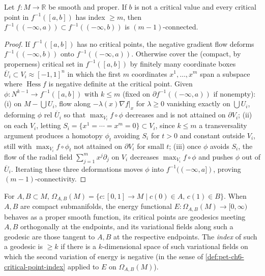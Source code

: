 \begin{theorem}[Theorem 6.5.2]
  \label{thm:pet-ch6-morse-connectivity}
  Let $f:M\to\mathbb{R}$ be smooth and proper. If $b$ is not a critical value and
  every critical point in $f^{-1}([a,b])$ has index $\ge m$, then
  $f^{-1}((-\infty,a))\subset f^{-1}((-\infty,b))$ is $(m-1)$-connected.
\end{theorem}
\begin{proof}
  If $f^{-1}([a,b])$ has no critical points, the negative gradient flow
  deforms $f^{-1}((-\infty,b))$ onto $f^{-1}((-\infty,a))$. Otherwise cover
  the (compact, by properness) critical set in $f^{-1}([a,b])$ by finitely
  many coordinate boxes $\overline U_i\subset V_i\approx[-1,1]^n$ in which the
  first $m$ coordinates $x^1,\dots,x^m$ span a subspace where $\operatorname{Hess}f$ is
  negative definite at the critical point. Given
  $\phi:N^{k-1}\to f^{-1}([a,b])$ with $k\le m$ (fixed on
  $\partial f^{-1}((-\infty,a))$ if nonempty): (i) on $M-\bigcup U_i$, flow
  along $-\lambda(x)\nabla f|_x$ for $\lambda\ge0$ vanishing exactly on
  $\bigcup U_i$, deforming $\phi$ rel $\overline U_i$ so that
  $\max_{V_i}f\circ\phi$ decreases and is not attained on $\partial V_i$;
  (ii) on each $V_i$, letting $S_i=\{x^1=\cdots=x^m=0\}\subset V_i$, since
  $k\le m$ a transversality argument produces a homotopy $\phi_t$ avoiding
  $S_i$ for $t>0$ and constant outside $V_i$, still with $\max_{V_i}
  f\circ\phi_t$ not attained on $\partial V_i$ for small $t$; (iii) once
  $\phi$ avoids $S_i$, the flow of the radial field
  $\sum_{j=1}^mx^j\partial_j$ on $V_i$ decreases $\max_{V_i}f\circ\phi$ and
  pushes $\phi$ out of $\overline U_i$. Iterating these three deformations
  moves $\phi$ into $f^{-1}((-\infty,a])$, proving $(m-1)$-connectivity.
\end{proof}

\begin{definition}
  \label{def:pet-ch6-path-space-AB}
  \leanok
  For $A,B\subset M$, $\Omega_{A,B}(M)=\{c:[0,1]\to M\mid c(0)\in A,\,c(1)\in
  B\}$. When $A,B$ are compact submanifolds, the energy functional
  $E:\Omega_{A,B}(M)\to[0,\infty)$ behaves as a proper smooth function, its
  critical points are geodesics meeting $A,B$ orthogonally at the endpoints,
  and its variational fields along such a geodesic are those tangent to $A,B$
  at the respective endpoints. The \emph{index} of such a geodesic is $\ge k$
  if there is a $k$-dimensional space of such variational fields on which the
  second variation of energy is negative (in the sense of
  \cref{def:pet-ch6-critical-point-index} applied to $E$ on
  $\Omega_{A,B}(M)$).
\end{definition}

